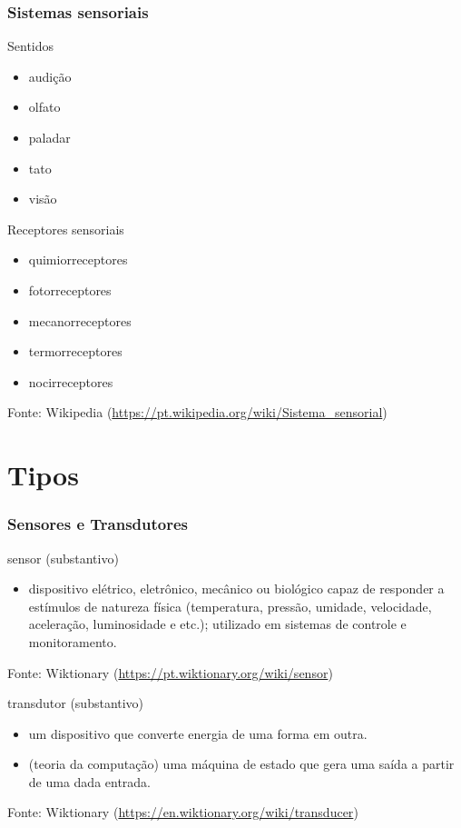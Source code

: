 \documentclass{beamer}
\begin{document}
\begin{frame}
	\frametitle{Sistemas sensoriais}
	Sentidos
	\begin{itemize}
		\item audição
		\item olfato
		\item paladar
		\item tato
		\item visão
	\end{itemize}
	Receptores sensoriais
	\begin{itemize}
		\item quimiorreceptores
		\item fotorreceptores
		\item mecanorreceptores
		\item termorreceptores
		\item nocirreceptores
	\end{itemize}
	{\scriptsize Fonte: Wikipedia (\url{https://pt.wikipedia.org/wiki/Sistema_sensorial})}
\end{frame}

\section{Tipos}

\begin{frame}
	\frametitle{Sensores e Transdutores}
	sensor (substantivo)
	\begin{itemize}
		\item dispositivo elétrico, eletrônico, mecânico ou biológico capaz de responder a estímulos de natureza física (temperatura, pressão, umidade, velocidade, aceleração, luminosidade e etc.); utilizado em sistemas de controle e monitoramento.
	\end{itemize}
	{\scriptsize Fonte: Wiktionary (\url{https://pt.wiktionary.org/wiki/sensor})}
	\bigskip
	
	transdutor (substantivo)
	\begin{itemize}
		\item um dispositivo que converte energia de uma forma em outra.
		\item (teoria da computação) uma máquina de estado que gera uma saída a partir de uma dada entrada.
	\end{itemize}
	{\scriptsize Fonte: Wiktionary (\url{https://en.wiktionary.org/wiki/transducer})}
\end{frame}
\end{document}
